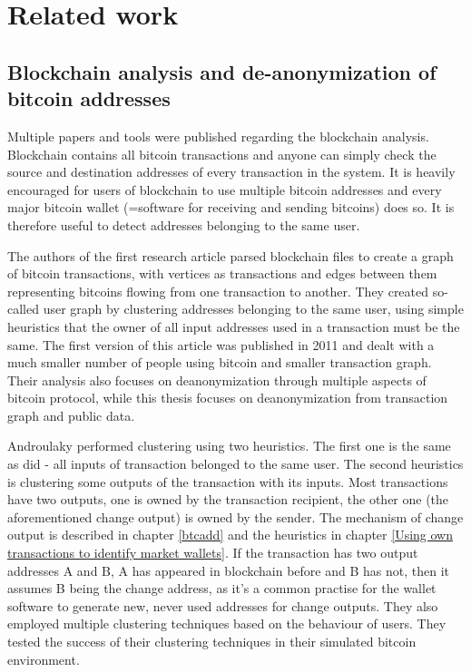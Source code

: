 \documentclass[
  digital, %
  table,   %
  lof,     %
  lot,     %
  oneside
]{fithesis3}
\begin{document}
\chapter{Related work}
\section{Blockchain analysis and de-anonymization of bitcoin addresses}

Multiple papers and tools were published regarding the blockchain analysis.
Blockchain contains all bitcoin transactions and anyone can simply check
the source and destination addresses of every transaction in the system.
It is heavily encouraged for users of blockchain to use multiple bitcoin addresses
 and every major bitcoin wallet (=software for receiving and sending bitcoins) does so.
 It is therefore useful to detect addresses belonging to the same user.
 
The authors of the first research article \parencite{reid2013analysis}
 parsed blockchain files to create a graph of bitcoin transactions, with vertices as transactions
 and edges between them representing bitcoins flowing from one transaction to another.
 They created so-called user graph by clustering addresses belonging to the same user, using
 simple heuristics that the owner of all input addresses used in a transaction must be the same. The first version of this article  
was published in 2011 and dealt with a much smaller number of people using bitcoin and smaller transaction graph.
Their analysis also focuses on deanonymization through multiple aspects of bitcoin protocol,
while this thesis focuses on deanonymization from transaction graph and public data.

Androulaky \parencite{androulaki2013evaluating} performed clustering using two heuristics.
The first one is the same as \parencite{reid2013analysis} did - all inputs of transaction
belonged to the same user. The second heuristics is clustering some outputs of the transaction with its inputs.
Most transactions have two outputs, one is owned by the transaction recipient,
the other one (the aforementioned change output) is owned by
the sender. The mechanism of change output is described in chapter \ref{btcadd} and the heuristics in
chapter \ref{Using own transactions to identify market wallets}.
If the transaction has two output addresses A and B, A has appeared in blockchain
before and B has not, then it assumes B being the change address, as it's a common practise
for the wallet software to generate new, never used addresses for change outputs.
They also employed multiple clustering techniques based on the behaviour of users.
 They tested the success of their clustering techniques in their simulated bitcoin 
 environment.
\end{document}
